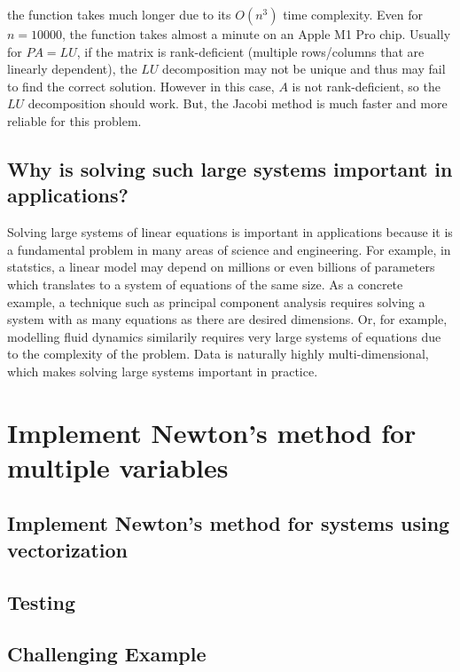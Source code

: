 \documentclass[11pt]{article}
\begin{document}


the function takes much longer due to its $O(n^3)$ time complexity. Even for $n = 10000$, the function takes almost a minute on an Apple M1 Pro chip. Usually for $PA = LU$, if the matrix is rank-deficient (multiple rows/columns that are linearly dependent), the $LU$ decomposition may not be unique and thus may fail to find the correct solution. However in this case, $A$ is not rank-deficient, so the $LU$ decomposition should work. But, the Jacobi method is much faster and more reliable for this problem.

\subsection{Why is solving such large systems important in applications?}

Solving large systems of linear equations is important in applications because it is a fundamental problem in many areas of science and engineering. For example, in statstics, a linear model may depend on millions or even billions of parameters which translates to a system of equations of the same size. As a concrete example, a technique such as principal component analysis requires solving a system with as many equations as there are desired dimensions. Or, for example, modelling fluid dynamics similarily requires very large systems of equations due to the complexity of the problem. Data is naturally highly multi-dimensional, which makes solving large systems important in practice.

\section{Implement Newton's method for multiple variables}

\subsection{Implement Newton's method for systems using vectorization}

\subsection{Testing}

\subsection{Challenging Example}
\end{document}
